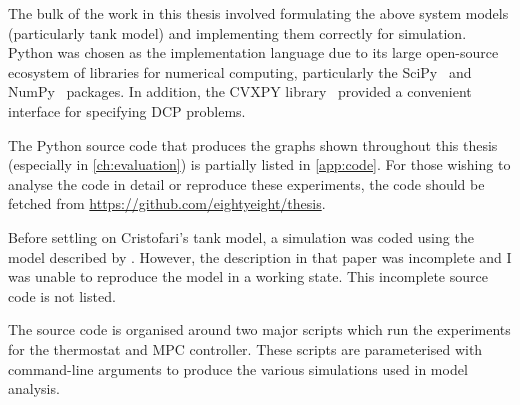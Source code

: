The bulk of the work in this thesis involved formulating the above system models (particularly tank model) and implementing them correctly for simulation.
Python was chosen as the implementation language due to its large open-source ecosystem of libraries for numerical computing, particularly the SciPy~\cite{SCIPY} and NumPy~\cite{Walt11} packages.
In addition, the CVXPY library~\cite{CVXPY} provided a convenient interface for specifying DCP problems.

The Python source code that produces the graphs shown throughout this thesis (especially in \autoref{ch:evaluation}) is partially listed in \autoref{app:code}.
For those wishing to analyse the code in detail or reproduce these experiments, the code should be fetched from \url{https://github.com/eightyeight/thesis}.

Before settling on Cristofari's tank model, a simulation was coded using the model described by \textcite{Pfeiffer11}.
However, the description in that paper was incomplete and I was unable to reproduce the model in a working state.
This incomplete source code is not listed.

The source code is organised around two major scripts which run the experiments for the thermostat and MPC controller.
These scripts are parameterised with command-line arguments to produce the various simulations used in model analysis.
